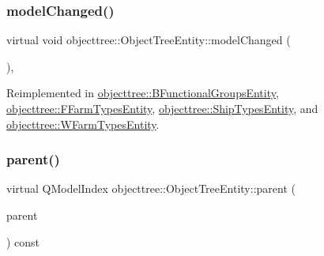 \mbox{\label{classobjecttree_1_1_object_tree_entity_a167db83e542f7e9e760e7e2a5548cc3a}} 
\subsubsection{\texorpdfstring{modelChanged()}{modelChanged()}}
{\footnotesize\ttfamily virtual void objecttree\+::\+Object\+Tree\+Entity\+::model\+Changed (\begin{DoxyParamCaption}\item[{int}]{ }\end{DoxyParamCaption})\hspace{0.3cm}{\ttfamily [inline]}, {\ttfamily [virtual]}}



Reimplemented in \mbox{\hyperlink{classobjecttree_1_1_b_functional_groups_entity_aa7b89957ec605a79278a3a26566d44fd}{objecttree\+::\+B\+Functional\+Groups\+Entity}}, \mbox{\hyperlink{classobjecttree_1_1_f_farm_types_entity_a8abefd5918712d86ef6c678fbdc611e8}{objecttree\+::\+F\+Farm\+Types\+Entity}}, \mbox{\hyperlink{classobjecttree_1_1_ship_types_entity_ac6de6e4f2f20d054cfb956d7bc8cf875}{objecttree\+::\+Ship\+Types\+Entity}}, and \mbox{\hyperlink{classobjecttree_1_1_w_farm_types_entity_aaaf9934a880c55661e9e3bcb3443c631}{objecttree\+::\+W\+Farm\+Types\+Entity}}.

\mbox{\label{classobjecttree_1_1_object_tree_entity_a2d1b13c056476f87637aacd7e99e7305}} 
\subsubsection{\texorpdfstring{parent()}{parent()}}
{\footnotesize\ttfamily virtual Q\+Model\+Index objecttree\+::\+Object\+Tree\+Entity\+::parent (\begin{DoxyParamCaption}\item[{const Q\+Model\+Index \&}]{parent }\end{DoxyParamCaption}) const\hspace{0.3cm}{\ttfamily [pure virtual]}}



